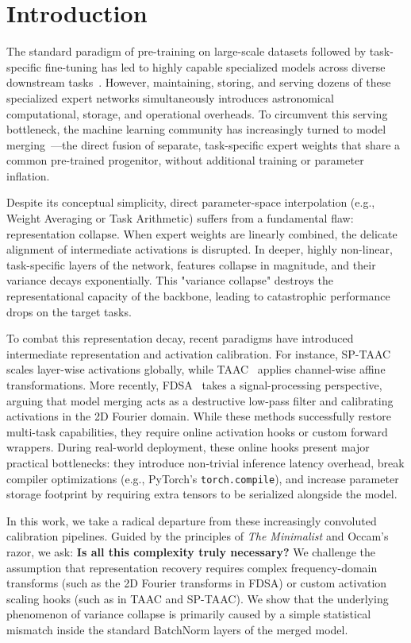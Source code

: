 \documentclass{article}
\theoremstyle{plain}
\theoremstyle{definition}
\theoremstyle{remark}
\begin{document}
\section{Introduction}
\label{sec:intro}
The standard paradigm of pre-training on large-scale datasets followed by task-specific fine-tuning has led to highly capable specialized models across diverse downstream tasks~\cite{he16}. However, maintaining, storing, and serving dozens of these specialized expert networks simultaneously introduces astronomical computational, storage, and operational overheads. To circumvent this serving bottleneck, the machine learning community has increasingly turned to model merging~\cite{wortsman22,ilharco23}—the direct fusion of separate, task-specific expert weights that share a common pre-trained progenitor, without additional training or parameter inflation.

Despite its conceptual simplicity, direct parameter-space interpolation (e.g., Weight Averaging or Task Arithmetic) suffers from a fundamental flaw: representation collapse. When expert weights are linearly combined, the delicate alignment of intermediate activations is disrupted. In deeper, highly non-linear, task-specific layers of the network, features collapse in magnitude, and their variance decays exponentially. This "variance collapse" destroys the representational capacity of the backbone, leading to catastrophic performance drops on the target tasks.

To combat this representation decay, recent paradigms have introduced intermediate representation and activation calibration. For instance, SP-TAAC~\cite{sptaac2026} scales layer-wise activations globally, while TAAC~\cite{taac2026} applies channel-wise affine transformations. More recently, FDSA~\cite{fdsa2026} takes a signal-processing perspective, arguing that model merging acts as a destructive low-pass filter and calibrating activations in the 2D Fourier domain. While these methods successfully restore multi-task capabilities, they require online activation hooks or custom forward wrappers. During real-world deployment, these online hooks present major practical bottlenecks: they introduce non-trivial inference latency overhead, break compiler optimizations (e.g., PyTorch's \texttt{torch.compile}), and increase parameter storage footprint by requiring extra tensors to be serialized alongside the model.

In this work, we take a radical departure from these increasingly convoluted calibration pipelines. Guided by the principles of \textit{The Minimalist} and Occam's razor, we ask: \textbf{Is all this complexity truly necessary?} We challenge the assumption that representation recovery requires complex frequency-domain transforms (such as the 2D Fourier transforms in FDSA) or custom activation scaling hooks (such as in TAAC and SP-TAAC). We show that the underlying phenomenon of variance collapse is primarily caused by a simple statistical mismatch inside the standard BatchNorm layers of the merged model. 
\end{document}

